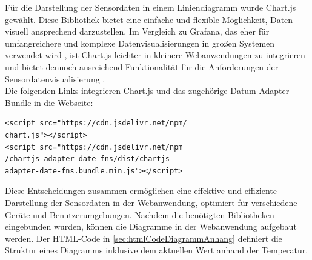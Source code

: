 \documentclass[conference]{IEEEtran}
\begin{document}
Für die Darstellung der Sensordaten in einem Liniendiagramm wurde Chart.js gewählt. Diese Bibliothek bietet eine einfache und flexible Möglichkeit, Daten visuell ansprechend darzustellen. Im Vergleich zu Grafana, das eher für umfangreichere und komplexe Datenvisualisierungen in großen Systemen verwendet wird \cite{grafana}, ist Chart.js leichter in kleinere Webanwendungen zu integrieren und bietet dennoch ausreichend Funktionalität für die Anforderungen der Sensordatenvisualisierung \cite{chart.js}. \\
Die folgenden Links integrieren Chart.js und das zugehörige Datum-Adapter-Bundle in die Webseite:
\begin{verbatim}
<script src="https://cdn.jsdelivr.net/npm/
chart.js"></script>
<script src="https://cdn.jsdelivr.net/npm
/chartjs-adapter-date-fns/dist/chartjs-
adapter-date-fns.bundle.min.js"></script>
\end{verbatim}
Diese Entscheidungen zusammen ermöglichen eine effektive und effiziente Darstellung der Sensordaten in der Webanwendung, optimiert für verschiedene Geräte und Benutzerumgebungen.
Nachdem die benötigten Bibliotheken eingebunden wurden, können die Diagramme in der Webanwendung aufgebaut werden. Der  HTML-Code in \ref{sec:htmlCodeDiagrammAnhang} definiert die Struktur eines Diagramms inklusive dem aktuellen Wert anhand der Temperatur.
\end{document}
